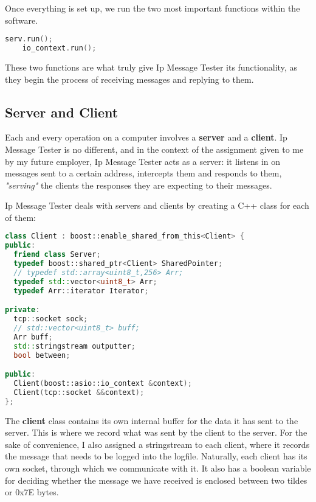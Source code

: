 \documentclass[openany,10pt,a4paper]{book}
\begin{document}
Once everything is set up, we run the two most important functions within the software.

\begin{lstlisting}[language=C++]
    serv.run();
    io_context.run();
\end{lstlisting}

These two functions are what truly give Ip Message Tester its functionality, as they begin the process of receiving messages and replying to them.

\subsection{Server and Client}

Each and every operation on a computer involves a \textbf{server} and a \textbf{client}. Ip Message Tester is no different, and in the context of the assignment given to me by my future employer, Ip Message Tester acts as a server: it listens in on messages sent to a certain address, intercepts them and responds to them, \textit{"serving"} the clients the responses they are expecting to their messages.

Ip Message Tester deals with servers and clients by creating a C++ class for each of them:

\begin{lstlisting}[language=C++]
class Client : boost::enable_shared_from_this<Client> {
public:
  friend class Server;
  typedef boost::shared_ptr<Client> SharedPointer;
  // typedef std::array<uint8_t,256> Arr;
  typedef std::vector<uint8_t> Arr;
  typedef Arr::iterator Iterator;

private:
  tcp::socket sock;
  // std::vector<uint8_t> buff;
  Arr buff;
  std::stringstream outputter;
  bool between;

public:
  Client(boost::asio::io_context &context);
  Client(tcp::socket &&context);
};
\end{lstlisting}

The \textbf{client} class contains its own internal buffer for the data it has sent to the server. This is where we record what was sent by the client to the server. For the sake of convenience, I also assigned a stringstream to each client, where it records the message that needs to be logged into the logfile. Naturally, each client has its own socket, through which we communicate with it. It also has a boolean variable for deciding whether the message we have received is enclosed between two tildes or 0x7E bytes.
\end{document}
